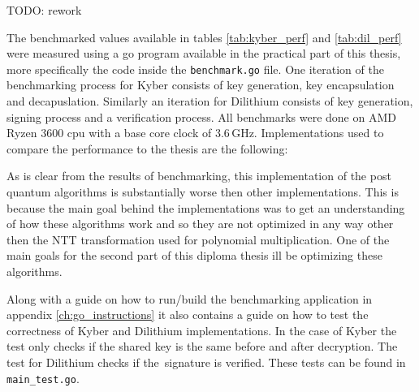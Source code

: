 TODO: rework

The benchmarked values available in tables \ref{tab:kyber_perf} and \ref{tab:dil_perf} were measured using a go program available in the practical part of this thesis, more specifically the code inside the \texttt{benchmark.go} file. One iteration of the benchmarking process for Kyber consists of key generation, key encapsulation and decapuslation. Similarly an iteration for Dilithium consists of key generation, signing process and a verification process. All benchmarks were done on AMD Ryzen 3600 cpu with a base core clock of 3.6\,GHz. Implementations used to compare the performance to the thesis are the following:
\begin{itemize}
\end{itemize}
\noindent As is clear from the results of benchmarking, this implementation of the post quantum algorithms is substantially worse then other implementations. This is because the main goal behind the implementations was to get an understanding of how these algorithms work and so they are not optimized in any way other then the NTT transformation used for polynomial multiplication. One of the main goals for the second part of this diploma thesis ill be optimizing these algorithms.

Along with a guide on how to run/build the benchmarking application in appendix \ref{ch:go_instructions} it also contains a guide on how to test the correctness of Kyber and Dilithium implementations. In the case of Kyber the test only checks if the shared key is the same before and after decryption. The test for Dilithium checks if the~signature is verified. These tests can be found in \texttt{main\_test.go}.


